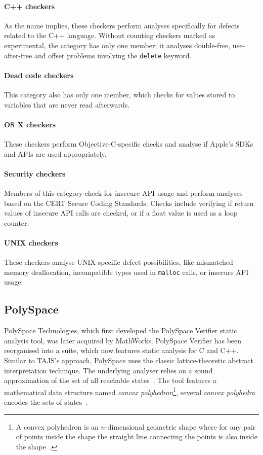 \paragraph{C++ checkers} As the name implies, these checkers perform analyses specifically for defects related to the C++ language. Without counting checkers marked as experimental, the category has only one member; it analyses double-free, use-after-free and offset problems involving the \lstinline{delete} keyword.

\paragraph{Dead code checkers} This category also has only one member, which checks for values stored to variables that are never read afterwards.

\paragraph{OS X checkers} These checkers perform Objective-C-specific checks and analyse if Apple's SDKs and APIs are used appropriately.

\paragraph{Security checkers} Members of this category check for insecure API usage and perform analyses based on the CERT Secure Coding Standards. Checks include verifying if return values of insecure API calls are checked, or if a float value is used as a loop counter.

\paragraph{UNIX checkers} These checkers analyse UNIX-specific defect possibilities, like mismatched memory deallocation, incompatible types used in \lstinline{malloc} calls, or insecure API usage.


\subsection{PolySpace}

PolySpace Technologies, which first developed the PolySpace Verifier static analysis tool, was later acquired by MathWorks. PolySpace Verifier has been reorganised into a suite, which now features static analysis for C and C++. Similar to TAJS's approach, PolySpace uses the classic lattice-theoretic abstract interpretation technique. The underlying analyser relies on a sound approximation of the set of all reachable states~\cite{emanuelsson2008comparative}. The tool features a mathematical data structure named \emph{convex polyhedron}\footnote{A convex polyhedron is an $n$-dimensional geometric shape where for any pair of points inside the shape the straight line connecting the points is also inside the shape~\cite{emanuelsson2008comparative}.}, several \emph{convex polyhedra} encodes the sets of states~\cite{cousot1978automatic}.

